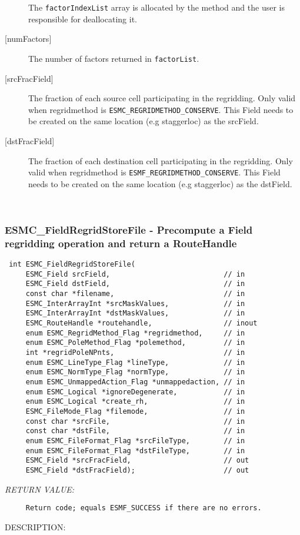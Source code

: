 \begin{description}
      The {\tt factorIndexList} array is allocated by the method and the user is responsible for deallocating it. 
    \item [{[numFactors]}] 
      The number of factors returned in {\tt factorList}.
    \item [{[srcFracField]}] 
      The fraction of each source cell participating in the regridding. Only 
      valid when regridmethod is {\tt ESMC\_REGRIDMETHOD\_CONSERVE}.
      This Field needs to be created on the same location (e.g staggerloc) 
      as the srcField.
    \item [{[dstFracField]}] 
      The fraction of each destination cell participating in the regridding. Only 
      valid when regridmethod is {\tt ESMF\_REGRIDMETHOD\_CONSERVE}.
      This Field needs to be created on the same location (e.g staggerloc) 
      as the dstField.
    \end{description}
   
 
\mbox{}\hrulefill\ 
 
\subsubsection [ESMC\_FieldRegridStoreFile] {ESMC\_FieldRegridStoreFile - Precompute a Field regridding operation and return a RouteHandle}


  
\begin{verbatim} int ESMC_FieldRegridStoreFile(
     ESMC_Field srcField,                           // in
     ESMC_Field dstField,                           // in
     const char *filename,                          // in
     ESMC_InterArrayInt *srcMaskValues,             // in
     ESMC_InterArrayInt *dstMaskValues,             // in
     ESMC_RouteHandle *routehandle,                 // inout
     enum ESMC_RegridMethod_Flag *regridmethod,     // in
     enum ESMC_PoleMethod_Flag *polemethod,         // in
     int *regridPoleNPnts,                          // in
     enum ESMC_LineType_Flag *lineType,             // in
     enum ESMC_NormType_Flag *normType,             // in
     enum ESMC_UnmappedAction_Flag *unmappedaction, // in
     enum ESMC_Logical *ignoreDegenerate,           // in
     enum ESMC_Logical *create_rh,                  // in
     ESMC_FileMode_Flag *filemode,                  // in
     const char *srcFile,                           // in
     const char *dstFile,                           // in
     enum ESMC_FileFormat_Flag *srcFileType,        // in
     enum ESMC_FileFormat_Flag *dstFileType,        // in
     ESMC_Field *srcFracField,                      // out
     ESMC_Field *dstFracField);                     // out
 \end{verbatim}{\em RETURN VALUE:}
\begin{verbatim}     Return code; equals ESMF_SUCCESS if there are no errors.\end{verbatim}
{\sf DESCRIPTION:\\ }


